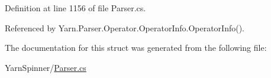 Definition at line 1156 of file Parser.\-cs.



Referenced by Yarn.\-Parser.\-Operator.\-Operator\-Info.\-Operator\-Info().



The documentation for this struct was generated from the following file\-:\begin{DoxyCompactItemize}
\item 
Yarn\-Spinner/\hyperlink{a00295}{Parser.\-cs}\end{DoxyCompactItemize}
